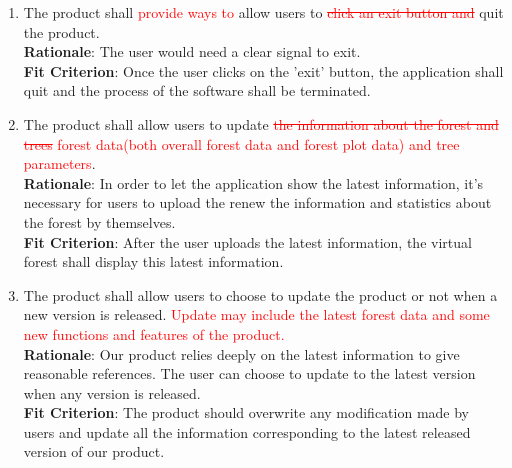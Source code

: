 \documentclass{article}
\begin{document}
\begin{enumerate}[FR1]
	\item The product shall \textcolor{red}{provide ways to }allow users to \textcolor{red}{\st{click
	 an exit button and}} quit the product.\\
	\textbf{Rationale}: The user would need a clear signal to exit.\\
	\textbf{Fit Criterion}: Once the user clicks on the 'exit' button, the application shall quit and the process of the software shall be terminated.
    
    \item The product shall allow users to update \textcolor{red}{\st{the information about the forest
     and trees} forest data(both overall forest data and forest plot data) and tree parameters}.\\
	\textbf{Rationale}: In order to let the application show the latest information, it's necessary for
	 users to upload the renew the information and statistics about the forest by themselves.\\
	\textbf{Fit Criterion}: After the user uploads the latest information, the virtual forest shall
	 display this latest information. 
	
	\item The product shall allow users to choose to update the product or not when a new
	 version is released. \textcolor{red}{Update may include the latest forest data and
	 some new functions and features of the product.}\\
	\textbf{Rationale}: Our product relies deeply on the latest information to give reasonable
	 references. The user can choose to update to the latest version when any version is released.\\
	\textbf{Fit Criterion}: The product should overwrite any modification made by users and update all
	 the information corresponding to the latest released version of our product.
\end{enumerate}
\end{document}
